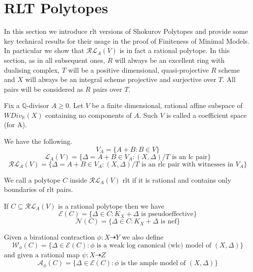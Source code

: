 	\section{RLT Polytopes}
	
	In this section we introduce rlt versions of Shokurov Polytopes and provide some key technical results for their usage in the proof of Finiteness of Minimal Models. In particular we show that $\mathcal{RL}_{A}(V)$ is in fact a rational polytope. In this section, as in all subsequent ones, $R$ will always be an excellent ring with dualising complex, $T$ will be a positive dimensional, quasi-projective $R$ scheme and $X$ will always be an integral scheme projective and surjective over $T$. All pairs will be considered as $R$ pairs over $T$.
	
	\begin{definition}
		
		Fix a $\mathbb{Q}$-divisor $A\geq 0$. Let $V$ be a finite dimensional, rational affine subspace of $WDiv_{\mathbb{R}}(X)$ containing no components of $A$. Such $V$ is called a coefficient space (for A).
		
		We have the following.
		\[V_{A}= \{A+B: B \in V\}\]
		\[\mathcal{L}_{A}(V)=\{\Delta=A+B \in V_{A}: (X,\Delta)/T \text{ is an lc pair}\}\]
		\[\mathcal{RL}_{A}(V)=\{\Delta=A+B \in V_{A}: (X,\Delta)/T \text{ is an rlc pair with witnesses in } V_{A}\}\]
		
		We call a polytope $C$ inside $\mathcal{RL}_{A}(V)$ rlt if it is rational and contains only boundaries of rlt pairs.
		
		If $C \subseteq \mathcal{RL}_{A}(V)$ is a rational polytope then we have
		\[\mathcal{E}(C)=\{\Delta \in C: K_{X}+\Delta \text{ is pseudoeffective}\}\]
		\[\mathcal{N}(C)=\{\Delta \in C: K_{X}+\Delta \text{ is nef}\}\]
		
		Given a birational contraction $\phi:X \dashrightarrow Y$ we also define
		\[\mathcal{W}_{\phi}(C)=\{\Delta \in \mathcal{E}(C): \phi \text{ is a weak log canonical (wlc) model of } (X,\Delta)\}\]
		and given a rational map $\psi:X \dashrightarrow Z$
		\[\mathcal{A}_{\phi}(C)=\{\Delta \in \mathcal{E}(C): \phi \text{ is the ample model of } (X,\Delta)\}\]
	\end{definition}
	
